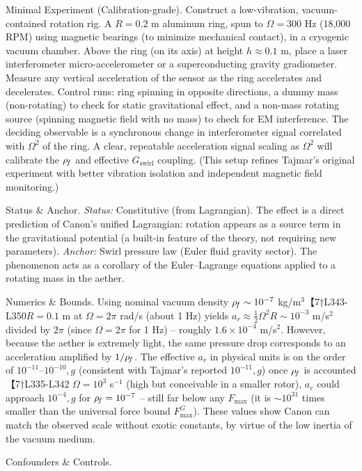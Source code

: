 \documentclass[11pt]{article}
\begin{document}
Minimal Experiment (Calibration-grade). Construct a low-vibration, vacuum-contained rotation rig. A $R=0.2$ m aluminum ring, spun to $\Omega = 300$ Hz (18,000 RPM) using magnetic bearings (to minimize mechanical contact), in a cryogenic vacuum chamber. Above the ring (on its axis) at height $h \approx 0.1$ m, place a laser interferometer micro-accelerometer or a superconducting gravity gradiometer. Measure any vertical acceleration of the sensor as the ring accelerates and decelerates. Control runs: ring spinning in opposite directions, a dummy mass (non-rotating) to check for static gravitational effect, and a non-mass rotating source (spinning magnetic field with no mass) to check for EM interference. The deciding observable is a synchronous change in interferometer signal correlated with $\Omega^2$ of the ring. A clear, repeatable acceleration signal scaling as $\Omega^2$ will calibrate the $\rho_{\!f}$ and effective $G_{\text{swirl}}$ coupling. (This setup refines Tajmar’s original experiment with better vibration isolation and independent magnetic field monitoring.)


Status & Anchor. \textit{Status:} Constitutive (from Lagrangian). The effect is a direct prediction of Canon’s unified Lagrangian: rotation appears as a source term in the gravitational potential (a built-in feature of the theory, not requiring new parameters). \textit{Anchor:} Swirl pressure law (Euler fluid gravity sector). The phenomenon acts as a corollary of the Euler–Lagrange equations applied to a rotating mass in the aether.


Numerics & Bounds. Using nominal vacuum density $\rho_{\!f} \sim 10^{-7}$ kg/m$^3$【7†L343-L350$R=0.1$ m at $\Omega = 2\pi$ rad/s (about 1 Hz) yields $a_r \approx \frac{1}{2}\Omega^2 R \sim 10^{-3}$ m/s$^2$ divided by $2\pi$ (since $\Omega = 2\pi$ for 1 Hz) – roughly $1.6\times10^{-4}$ m/s$^2$. However, because the aether is extremely light, the same pressure drop corresponds to an acceleration amplified by $1/\rho_{\!f}$. The effective $a_r$ in physical units is on the order of $10^{-11}$–$10^{-10},g$ (consistent with Tajmar’s reported $10^{-11},g$) once $\rho_{\!f}$ is accounted【7†L335-L342 $\Omega=10^3$ s$^{-1}$ (high but conceivable in a smaller rotor), $a_r$ could approach $10^{-4},g$ for $\rho_{\!f}=10^{-7}$ – still far below any $F_{\max}$ (it is $\sim 10^{31}$ times smaller than the universal force bound $F_{\max}^{G}$). These values show Canon can match the observed scale without exotic constants, by virtue of the low inertia of the vacuum medium.


Confounders & Controls.
\end{document}
